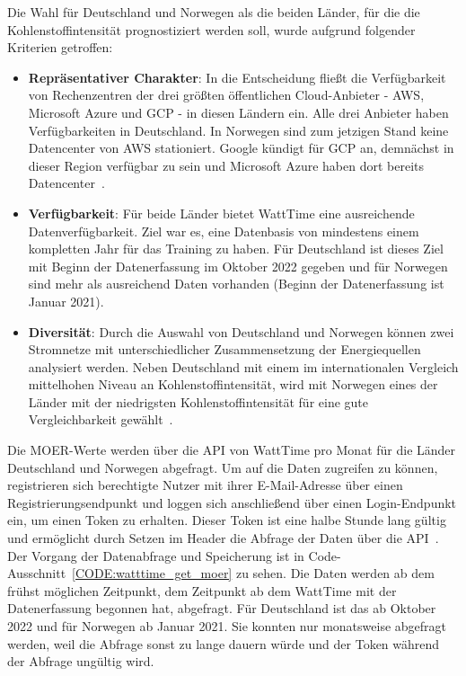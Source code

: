 Die Wahl für Deutschland und Norwegen als die beiden Länder, für die die Kohlenstoffintensität prognostiziert werden soll, wurde aufgrund folgender Kriterien getroffen:
\begin{itemize}
 \item \textbf{Repräsentativer Charakter}: In die Entscheidung fließt die Verfügbarkeit von Rechenzentren der drei größten öffentlichen Cloud-Anbieter - \ac{AWS}, Microsoft Azure und \ac{GCP} - in diesen Ländern ein.
 Alle drei Anbieter haben Verfügbarkeiten in Deutschland.
 In Norwegen sind zum jetzigen Stand keine Datencenter von \ac{AWS} stationiert.
 Google kündigt für \ac{GCP} an, demnächst in dieser Region verfügbar zu sein und Microsoft Azure haben dort bereits Datencenter~\cite{AmazonWebServices.20240318T18:30:19.000Z}\cite{GoogleCloud.20240311T07:04:17.000Z}\cite{Microsoft.20240307T01:34:37.000Z}.
 \item \textbf{Verfügbarkeit}: Für beide Länder bietet WattTime eine ausreichende Datenverfügbarkeit.
 Ziel war es, eine Datenbasis von mindestens einem kompletten Jahr für das Training zu haben.
 Für Deutschland ist dieses Ziel mit Beginn der Datenerfassung im Oktober 2022 gegeben und für Norwegen sind mehr als ausreichend Daten vorhanden (Beginn der Datenerfassung ist Januar 2021).
 \item \textbf{Diversität}: Durch die Auswahl von Deutschland und Norwegen können zwei Stromnetze mit unterschiedlicher Zusammensetzung der Energiequellen analysiert werden.
 Neben Deutschland mit einem im internationalen Vergleich mittelhohen Niveau an Kohlenstoffintensität, wird mit Norwegen eines der Länder mit der niedrigsten Kohlenstoffintensität für eine gute Vergleichbarkeit gewählt~\cite{ElectricityMaps.20240305T20:54:29.000Z}.
\end{itemize}
Die \ac{MOER}-Werte werden über die \ac{API} von WattTime pro Monat für die Länder Deutschland und Norwegen abgefragt.
Um auf die Daten zugreifen zu können, registrieren sich berechtigte Nutzer mit ihrer E-Mail-Adresse über einen Registrierungsendpunkt und loggen sich anschließend über einen Login-Endpunkt ein, um einen Token zu erhalten.
Dieser Token ist eine halbe Stunde lang gültig und ermöglicht durch Setzen im Header die Abfrage der Daten über die \ac{API}~\cite{WattTime.20.02.2024}.
Der Vorgang der Datenabfrage und Speicherung ist in Code-Ausschnitt~\ref{CODE:watttime_get_moer} zu sehen.
Die Daten werden ab dem frühst möglichen Zeitpunkt, dem Zeitpunkt ab dem WattTime mit der Datenerfassung begonnen hat, abgefragt.
Für Deutschland ist das ab Oktober 2022 und für Norwegen ab Januar 2021.
Sie konnten nur monatsweise abgefragt werden, weil die Abfrage sonst zu lange dauern würde und der Token während der Abfrage ungültig wird.

